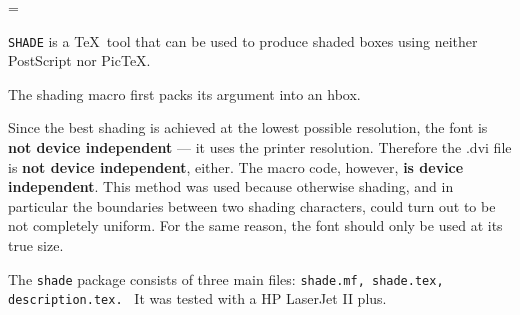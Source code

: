 
\magnification=
\parindent0pt \parskip 3pt


{\tt SHADE} is a \TeX\ tool that can be used to produce shaded boxes
using neither PostScript nor Pic\TeX.



The shading macro first packs its argument into an hbox.


Since the best shading is achieved at the lowest possible resolution,
the font  is {\bf not device independent} --- it uses
the printer resolution. Therefore the .dvi file is
{\bf not device independent}, either.
The macro code, however, {\bf is device independent}.
This method was used because otherwise shading, and in particular
the boundaries between two shading characters, could turn out to be not
completely uniform.
For the same reason, the font should only be used at its true size.

The {\tt shade} package consists of three main files:
    {\tt shade.mf,           %
         shade.tex,          %
         description.tex.    %
       }
It was tested with a HP LaserJet II plus.

\bye
